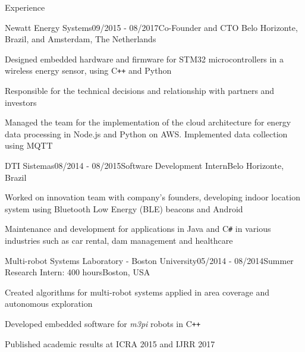 \documentclass[12pt, a4paper]{resume} %
\begin{document}
\begin{rSection}{Experience}
	\begin{rSubsection}{Newatt Energy Systems}{09/2015 - 08/2017}{\normalfont Co-Founder and CTO}{ \normalfont Belo Horizonte, Brazil, and Amsterdam, The Netherlands}
		\item Designed embedded hardware and firmware for STM32 microcontrollers in a wireless energy sensor, using C\texttt{++} and Python
		\item Responsible for the technical decisions and relationship with partners and investors
		\item Managed the team for the implementation of the cloud architecture for energy data processing in Node.js and Python on AWS. Implemented data collection using MQTT
	\end{rSubsection}


	\begin{rSubsection}{DTI Sistemas}{08/2014 - 08/2015}{\normalfont Software Development Intern}{\normalfont Belo Horizonte, Brazil}
		\item Worked on innovation team with company's founders, developing indoor location system using Bluetooth Low Energy (BLE) beacons and Android
		\item Maintenance and development for applications in Java and C\texttt{\#} in various industries such as car rental, dam management and healthcare
	\end{rSubsection}
\newpage
	\begin{rSubsection}{Multi-robot Systems Laboratory - Boston University}{05/2014 - 08/2014}{\normalfont Summer Research Intern: 400 hours}{\normalfont Boston,  USA}
		\item Created algorithms for multi-robot systems applied in area coverage and autonomous exploration
		\item Developed embedded software for \textit{m3pi} robots in C\texttt{++}
		\item Published academic results at ICRA 2015 and IJRR 2017
	\end{rSubsection}


\end{rSection}
\end{document}
